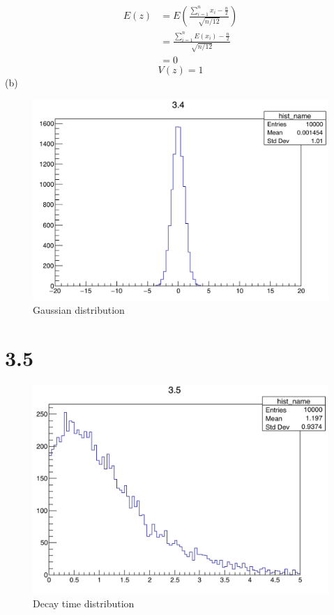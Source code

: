 \documentclass{article}
\begin{document}
\begin{CJK*}{GBK}{song}
\begin{equation}
\begin{aligned}
E(z)&=E\left(\frac{\sum_{i=1}^nx_i-\frac{n}{2}}{\sqrt{n/12}}\right)\\
&=\frac{\sum_{i=1}^nE(x_i)-\frac{n}{2}}{\sqrt{n/12}}\\
&=0
\end{aligned}
\end{equation}
\begin{equation}
V(z)=1
\end{equation}
(b)
\begin{figure}[H]
\centerline{\includegraphics[scale=0.4]{3.4.png}}
\caption{Gaussian distribution}
\label{fig:label}
\end{figure}




\section{3.5}

\begin{figure}[H]
\centerline{\includegraphics[scale=0.4]{3.5.png}}
\caption{Decay time distribution}
\label{fig:label}
\end{figure}







\end{CJK*}
\end{document}
